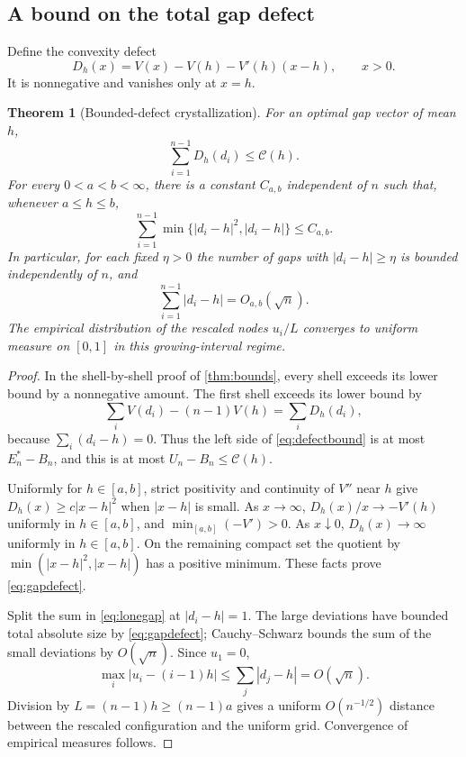 \documentclass[11pt,a4paper]{article}
\newtheorem{theorem}{Theorem}[section]
\theoremstyle{definition}
\theoremstyle{remark}
\newcommand{\cC}{\mathcal C}
\begin{document}
\subsection{A bound on the total gap defect}
Define the convexity defect
\begin{equation}
 D_h(x)=V(x)-V(h)-V'(h)(x-h),\qquad x>0.
 \label{eq:bregman}
\end{equation}
It is nonnegative and vanishes only at $x=h$.

\begin{theorem}[Bounded-defect crystallization]
\label{thm:crystallization}
For an optimal gap vector of mean $h$,
\begin{equation}
 \sum_{i=1}^{n-1}D_h(d_i)\le\cC(h).
 \label{eq:defectbound}
\end{equation}
For every $0<a<b<\infty$, there is a constant $C_{a,b}$ independent of
$n$ such that, whenever $a\le h\le b$,
\begin{equation}
 \sum_{i=1}^{n-1}\min\{|d_i-h|^2,|d_i-h|\}\le C_{a,b}.
 \label{eq:gapdefect}
\end{equation}
In particular, for each fixed $\eta>0$ the number of gaps with
$|d_i-h|\ge\eta$ is bounded independently of $n$, and
\begin{equation}
 \sum_{i=1}^{n-1}|d_i-h|=O_{a,b}(\sqrt n).
 \label{eq:lonegap}
\end{equation}
The empirical distribution of the rescaled nodes $u_i/L$ converges to
uniform measure on $[0,1]$ in this growing-interval regime.
\end{theorem}
\begin{proof}
In the shell-by-shell proof of \cref{thm:bounds}, every shell exceeds its
lower bound by a nonnegative amount. The first shell exceeds its lower
bound by
\[
 \sum_iV(d_i)-(n-1)V(h)=\sum_iD_h(d_i),
\]
because $\sum_i(d_i-h)=0$. Thus the left side of
\eqref{eq:defectbound} is at most $E_n^*-B_n$, and this is at most
$U_n-B_n\le\cC(h)$.

Uniformly for $h\in[a,b]$, strict positivity and continuity of $V''$ near
$h$ give $D_h(x)\ge c|x-h|^2$ when $|x-h|$ is small.
As $x\to\infty$, $D_h(x)/x\to -V'(h)$ uniformly in $h\in[a,b]$, and
$\min_{[a,b]}(-V')>0$. As $x\downarrow0$, $D_h(x)\to\infty$ uniformly
in $h\in[a,b]$. On the remaining compact set the quotient by
$\min(|x-h|^2,|x-h|)$ has a positive minimum. These facts prove
\eqref{eq:gapdefect}.

Split the sum in \eqref{eq:lonegap} at $|d_i-h|=1$. The large deviations
have bounded total absolute size by \eqref{eq:gapdefect}; Cauchy--Schwarz
bounds the sum of the small deviations by $O(\sqrt n)$.
Since $u_1=0$,
\[
 \max_i|u_i-(i-1)h|\le\sum_j|d_j-h|=O(\sqrt n).
\]
Division by $L=(n-1)h\ge(n-1)a$ gives a uniform $O(n^{-1/2})$ distance
between the rescaled configuration and the uniform grid. Convergence of
empirical measures follows.
\end{proof}
\end{document}
